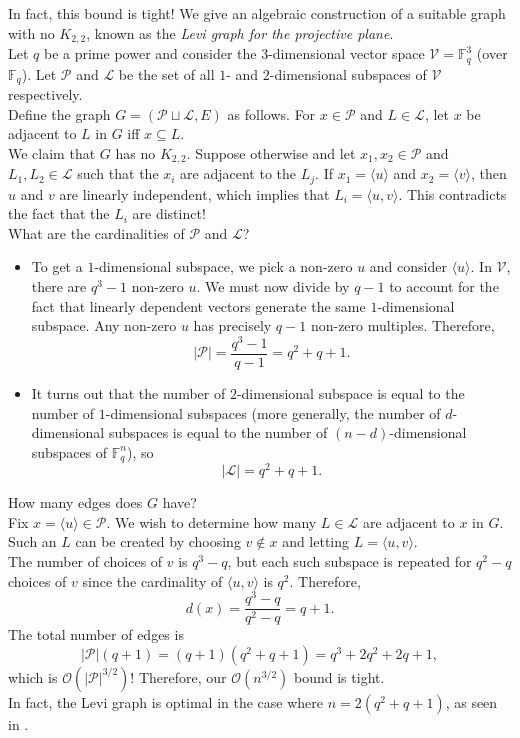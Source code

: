 \documentclass{article}
\begin{document}
			In fact, this bound is tight! We give an algebraic construction of a suitable graph with no $K_{2,2}$, known as the \emph{Levi graph for the projective plane}.\\
			Let $q$ be a prime power and consider the $3$-dimensional vector space $\mathcal{V} = \mathbb{F}_q^3$ (over $\mathbb{F}_q$). Let $\mathcal{P}$ and $\mathcal{L}$ be the set of all $1$- and $2$-dimensional subspaces of $\mathcal{V}$ respectively.\\
			Define the graph $G = ( \mathcal{P} \sqcup \mathcal{L} , E )$ as follows. For $x \in \mathcal{P}$ and $L \in \mathcal{L}$, let $x$ be adjacent to $L$ in $G$ iff $x \subseteq L$.\\
			We claim that $G$ has no $K_{2,2}$. Suppose otherwise and let $x_1,x_2\in\mathcal{P}$ and $L_1,L_2\in\mathcal{L}$ such that the $x_i$ are adjacent to the $L_j$. If $x_1 = \langle u \rangle$ and $x_2 = \langle v \rangle$, then $u$ and $v$ are linearly independent, which implies that $L_i = \langle u,v\rangle$. This contradicts the fact that the $L_i$ are distinct!\\
			What are the cardinalities of $\mathcal{P}$ and $\mathcal{L}$?
			\begin{itemize}
				\item To get a $1$-dimensional subspace, we pick a non-zero $u$ and consider $\langle u\rangle$. In $\mathcal{V}$, there are $q^3 - 1$ non-zero $u$. We must now divide by $q-1$ to account for the fact that linearly dependent vectors generate the same $1$-dimensional subspace. Any non-zero $u$ has precisely $q-1$ non-zero multiples. Therefore,
				\[ |\mathcal{P}| = \frac{q^3 - 1}{q - 1} = q^2 + q + 1. \]

				\item It turns out that the number of $2$-dimensional subspace is equal to the number of $1$-dimensional subspaces (more generally, the number of $d$-dimensional subspaces is equal to the number of $(n-d)$-dimensional subspaces of $\mathbb{F}_q^n$), so
				\[ |\mathcal{L}| = q^2 + q + 1. \]
			\end{itemize}
			How many edges does $G$ have?\\
			Fix $x = \langle u \rangle \in \mathcal{P}$. We wish to determine how many $L\in\mathcal{L}$ are adjacent to $x$ in $G$. Such an $L$ can be created by choosing $v \not\in x$ and letting $L = \langle u,v\rangle$.\\The number of choices of $v$ is $q^3 - q$, but each such subspace is repeated for $q^2 - q$ choices of $v$ since the cardinality of $\langle u,v\rangle$ is $q^2$. Therefore,
			\[ d(x) = \frac{q^3 - q}{q^2 - q} = q + 1. \]
			The total number of edges is
			\[ |\mathcal{P}| (q + 1) = (q+1)(q^2+q+1) = q^3 + 2q^2 + 2q + 1, \]
			which is $\mathcal{O}(|\mathcal{P}|^{3/2})$!
			Therefore, our $\mathcal{O}(n^{3/2})$ bound is tight.\\
			In fact, the Levi graph is optimal in the case where $n = 2(q^2 + q + 1)$, as seen in .
\end{document}
